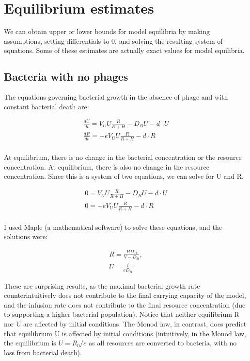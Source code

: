 \documentclass{article}
\begin{document}
\section {Equilibrium estimates}
We can obtain upper or lower bounds for model equilibria by making assumptions, setting differentials to 0, and solving the resulting system of equations. Some of these estimates are actually exact values for model equilibria.

\subsection{Bacteria with no phages}
The equations governing bacterial growth in the absence of phage and with constant bacterial death are:

\begin{equation}
\begin{split}
\frac{dU}{dt} = V_UU\frac{R}{R+H} - D_BU - d \cdot U \\
\frac{dR}{dt} = -eV_UU\frac{R}{R+H}  - d \cdot R \\
\end{split}
\end{equation}

At equilibrium, there is no change in the bacterial concentration or the resource concentration. At equilibrium, there is also no change in the resource concentration. Since this is a system of two equations, we can solve for U and R. 

\begin{equation}
\begin{split}
0 = V_UU\frac{R}{R+H} - D_BU - d \cdot U \\
0 = -eV_UU\frac{R}{R+H}  - d \cdot R \\
\end{split}
\end{equation}

I used Maple (a mathematical software) to solve these equations, and the solutions were:

\begin{equation}
\begin{split}
R = \frac{HD_B}{V - D_B}, \\ U = \frac{i}{eD_B}
\end{split}
\end{equation}

These are surprising results, as the maximal bacterial growth rate counterintuitively does not contribute to the final carrying capacity of the model, and the infusion rate does not contribute to the final resource concentration (due to supporting a higher bacterial population). Notice that neither equilibrium R nor U are affected by initial conditions. The Monod law, in contrast, does predict that equilibrium U is affected by initial conditions (intuitively, in the Monod law, the equilibrium is $U = R_0/e$ as all resources are converted to bacteria, with no loss from bacterial death). 
\end{document}
